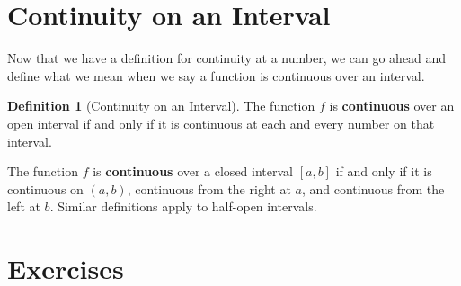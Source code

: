 \documentclass[12pt,]{book}
\newcommand{\terminology}[1]{\textbf{#1}}
\theoremstyle{plain}
\theoremstyle{definition}
\newtheorem{definition}[theorem]{Definition}
\numberwithin{equation}{section}
\newcommand{\cinterval}[2]{\left[#1,#2\right]}
\newcommand{\ointerval}[2]{\left(#1,#2\right)}
\begin{document}
\section[Continuity on an Interval]{Continuity on an Interval}\label{section-continuity-on-an-interval}
Now that we have a definition for continuity at a number, we can go ahead and define what we mean when we say a function is continuous over an interval.%
\begin{definition}[Continuity on an Interval]\label{definition-continuity-on-an-interval}
The function \(f\) is \terminology{continuous} over an open interval if and only if it is continuous at each and every number on that interval.%
\par
The function \(f\) is \terminology{continuous} over a closed interval \(\cinterval{a}{b}\) if and only if it is continuous on \(\ointerval{a}{b}\), continuous from the right at \(a\), and continuous from the left at \(b\). Similar definitions apply to half-open intervals.%
\end{definition}
\typeout{************************************************}
\typeout{************************************************}
\section*{Exercises}\label{exercises-14}
\end{document}
